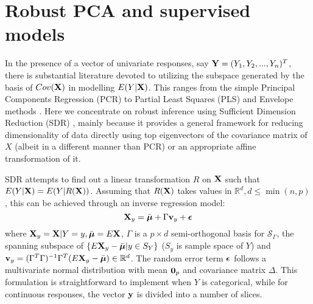\documentclass[12pt,letterpaper]{article}
\theoremstyle{definition} \newtheorem{Definition}[Theorem]{Definition}
\begin{document}
%
%
%

\section{Robust PCA and supervised models}

In the presence of a vector of univariate responses, say ${\mathbf{Y}} = (Y_1,Y_2,...,Y_n)^T$, there is substantial literature devoted to utilizing the subspace generated by the basis of $Cov({\mathbf{X}})$ in modelling $E(Y|{\mathbf{X}})$. This ranges from the simple Principal Components Regression (PCR) to Partial Least Squares (PLS) and Envelope methods \citep{Cook10}. Here we concentrate on robust inference using Sufficient Dimension Reduction (SDR) \citep{AdragniCook09}, mainly because it provides a general framework for reducing dimensionality of data directly using top eigenvectors of the covariance matrix of $X$ (albeit in a different manner than PCR) or an appropriate affine transformation of it.

SDR attempts to find out a linear transformation $R$ on ${\mathbf{X}}$ such that $E(Y|{\mathbf{X}}) = E(Y|R({\mathbf{X}}))$. Assuming that $R({\mathbf{X}})$ takes values in $\mathbb R^d, d \leq \min(n,p)$, this can be achieved through an inverse regression model:
%
\begin{equation}
{\mathbf{X}}_y = \bar {{\boldsymbol{\mu}}} + \Gamma {\bf{v}}_y + {\boldsymbol{\epsilon}}
\end{equation}
%
where ${\mathbf{X}}_y = {\mathbf{X}}|Y=y, \bar{{\boldsymbol{\mu}}} = E{\mathbf{X}}$, $\Gamma$ is a $p \times d$ semi-orthogonal basis for $\mathcal S_\Gamma$, the spanning subspace of $\{ E {\mathbf{X}}_y - \bar{{\boldsymbol{\mu}}} | y \in S _Y \}$ ($S_y$ is sample space of $Y$) and ${\bf{v}}_y = (\Gamma^T \Gamma)^{-1} \Gamma^T (E {\mathbf{X}}_y - \bar{{\boldsymbol{\mu}}}) \in \mathbb R^d$. The random error term ${\boldsymbol{\epsilon}}$ follows a multivariate normal distribution with mean ${\bf 0}_p$ and covariance matrix $\Delta$. This formulation is straightforward to implement when $Y$ is categorical, while for continuous responses, the vector ${\bf{y}}$ is divided into a number of slices.
\end{document}
